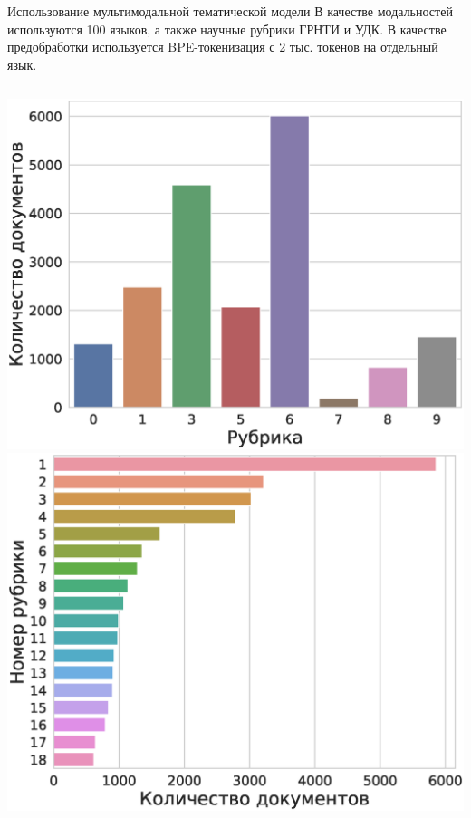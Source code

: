 \documentclass{beamer}
\begin{document}
\begin{frame}{Использование мультимодальной тематической модели}
В качестве модальностей используются {\color{red}100} языков, а также научные рубрики ГРНТИ и УДК. В качестве предобработки используется {\color{red}BPE-токенизация} с 2 тыс. токенов на отдельный язык.

\begin{columns}[c]
\includegraphics[width=1.0\textwidth]{udk.eps}
\includegraphics[width=1.0\textwidth]{grnti.eps}
\end{columns}

%
\end{frame}
\end{document}

